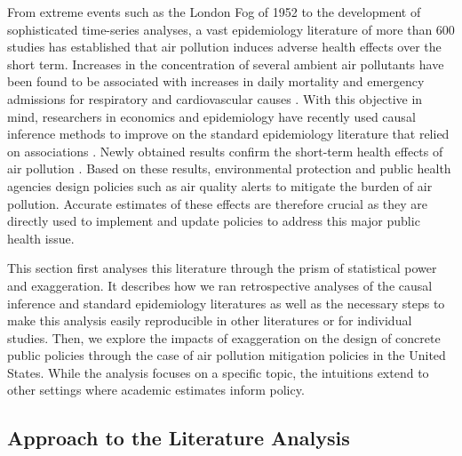 \documentclass[12pt]{article}
\begin{document}
	From extreme events such as the London Fog of 1952 to the development of sophisticated time-series analyses, a vast epidemiology literature of more than 600 studies has established that air pollution induces adverse health effects over the short term. Increases in the concentration of several ambient air pollutants have been found to be associated with increases in daily mortality and emergency admissions for respiratory and cardiovascular causes \citep{schwartz_what_1994, samet_national_2000, letertre_shortterm_2002, bell_time-series_2004, liu_ambient_2019}. With this objective in mind, researchers in economics and epidemiology have recently used causal inference methods to improve on the standard epidemiology literature that relied on associations \citep{dominici_best_2017, bind_causal_2019}. Newly obtained results confirm the short-term health effects of air pollution \citep{schwartz_estimating_2015, schwartz_national_2018, deryugina_mortality_2019}. Based on these results, environmental protection and public health agencies design policies such as air quality alerts to mitigate the burden of air pollution. Accurate estimates of these effects are therefore crucial as they are directly used to implement and update policies to address this major public health issue.
	
	This section first analyses this literature through the prism of statistical power and exaggeration. It describes how we ran retrospective analyses of the causal inference and standard epidemiology literatures as well as the necessary steps to make this analysis easily reproducible in other literatures or for individual studies. Then, we explore the impacts of exaggeration on the design of concrete public policies through the case of air pollution mitigation policies in the United States. While the analysis focuses on a specific topic, the intuitions extend to other settings where academic estimates inform policy. 
    
	\subsection{Approach to the Literature Analysis}
    
\end{document}
